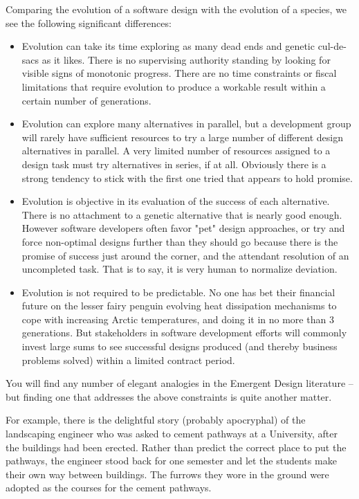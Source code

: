 \documentclass{article}
\begin{document}
\begin{enumerate}
Comparing the evolution of a software design with the evolution of a
species, we see the following significant differences:

\begin{itemize}
\item Evolution can take its time exploring as many dead ends and genetic
cul-de-sacs as it likes. There is no supervising authority standing
by looking for visible signs of monotonic progress. There are no time
constraints or fiscal limitations that require evolution to produce a
workable result within a certain number of generations.\\
\item Evolution can explore many alternatives in parallel, but a
development group will rarely have sufficient resources to try a
large number of different design alternatives in parallel. A very
limited number of resources assigned to a design task must try
alternatives in series, if at all. Obviously there is a strong
tendency to stick with the first one tried that appears to hold
promise.\\
\item Evolution is objective in its evaluation of the success of each
alternative. There is no attachment to a genetic alternative that is
nearly good enough. However software developers often favor "pet"
design approaches, or try and force non-optimal designs further than
they should go because there is the promise of success just around
the corner, and the attendant resolution of an uncompleted task. That
is to say, it is very human to normalize deviation.\\
\item Evolution is not required to be predictable. No one has bet their
financial future on the lesser fairy penguin evolving heat
dissipation mechanisms to cope with increasing Arctic temperatures,
and doing it in no more than 3 generations. But stakeholders in
software development efforts will commonly invest large sums to see
successful designs produced (and thereby business problems solved)
within a limited contract period.
\end{itemize}

You will find any number of elegant analogies in the Emergent Design
literature -- but finding one that addresses the above constraints is
quite another matter.

For example, there is the delightful story (probably apocryphal) of the
landscaping engineer who was asked to cement pathways at a University,
after the buildings had been erected. Rather than predict the correct
place to put the pathways, the engineer stood back for one semester and
let the students make their own way between buildings. The furrows they
wore in the ground were adopted as the courses for the cement pathways.


\end{enumerate}
\end{document}
